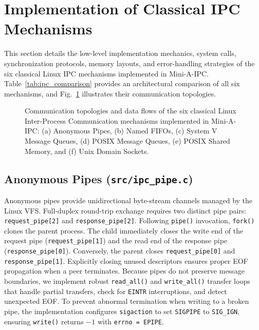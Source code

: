 \section{Implementation of Classical IPC Mechanisms}
\label{sec:ipc_implementation}

This section details the low-level implementation mechanics, system calls, synchronization protocols, memory layouts, and error-handling strategies of the six classical Linux IPC mechanisms implemented in Mini-A-IPC. Table~\ref{tab:ipc_comparison} provides an architectural comparison of all six mechanisms, and Fig.~\ref{fig:ipc_mechanisms} illustrates their communication topologies.



\begin{figure}[t]
\centering

\caption{Communication topologies and data flows of the six classical Linux Inter-Process Communication mechanisms implemented in Mini-A-IPC: (a) Anonymous Pipes, (b) Named FIFOs, (c) System V Message Queues, (d) POSIX Message Queues, (e) POSIX Shared Memory, and (f) Unix Domain Sockets.}
\label{fig:ipc_mechanisms}
\end{figure}

\subsection{Anonymous Pipes (\texttt{src/ipc\_pipe.c})}
Anonymous pipes provide unidirectional byte-stream channels managed by the Linux VFS. Full-duplex round-trip exchange requires two distinct pipe pairs: \texttt{request\_pipe[2]} and \texttt{response\_pipe[2]}.
Following \texttt{pipe()} invocation, \texttt{fork()} clones the parent process. The child immediately closes the write end of the request pipe (\texttt{request\_pipe[1]}) and the read end of the response pipe (\texttt{response\_pipe[0]}). Conversely, the parent closes \texttt{request\_pipe[0]} and \texttt{response\_pipe[1]}. Explicitly closing unused descriptors ensures proper EOF propagation when a peer terminates.
Because pipes do not preserve message boundaries, we implement robust \texttt{read\_all()} and \texttt{write\_all()} transfer loops that handle partial transfers, check for \texttt{EINTR} interruptions, and detect unexpected EOF. To prevent abnormal termination when writing to a broken pipe, the implementation configures \texttt{sigaction} to set \texttt{SIGPIPE} to \texttt{SIG\_IGN}, ensuring \texttt{write()} returns $-1$ with \texttt{errno = EPIPE}.

